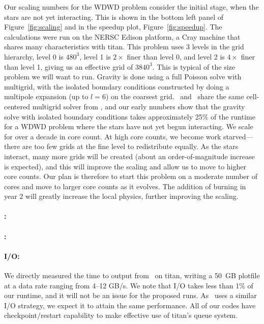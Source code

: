 Our scaling numbers for the WDWD problem consider the initial stage,
when the stars are not yet interacting.  This is shown in the bottom
left panel of Figure~\ref{fig:scaling} and in the speedup plot, Figure~\ref{fig:speedup}.
The calculations were run on the NERSC Edison
platform, a Cray machine that shares many characteristics with titan.
This problem uses 3 levels in the grid hierarchy, level 0 is $480^3$,
level 1 is $2\times$ finer than level 0, and level 2 is $4\times$
finer than level 1, giving us an effective grid of $3840^3$.  This is
typical of the size problem we will want to run.  Gravity is done
using a full Poisson solve with multigrid, with the isolated boundary
conditions constructed by doing a multipole expansion (up to $l=6$) on
the coarsest grid.  \castro\ and \maestro\ share the same
cell-centered multigrid solver from \boxlib, and our early numbers
show that the gravity solve with isolated boundary conditions takes
approximately 25\% of the runtime for a WDWD problem where the stars
have not yet begun interacting.  We scale for over a decade in core count.  At high core counts, we become work
starved---there are too few grids at the fine level to redistribute equally.  As the stars interact, many more grids will be created
(about an order-of-magnitude increase is expected), and this will
improve the scaling and allow us to move to higher core counts.  Our
plan is therefore to start this problem on a moderate number of cores
and move to larger core counts as it evolves.  The addition of burning
in year 2 will greatly increase the local physics, further improving
the scaling.

\paragraph{\flash: } 

\paragraph{\chimera: } 

\paragraph{I/O: } 
%
We directly measured the time to output from
\maestro\ on titan, writing a 50~GB plotfile at a data rate
ranging from 4--12 GB/s.  We note that I/O takes less than 1\% of our
runtime, and it will not be an issue for the proposed runs.
As \castro\ uses a similar I/O strategy, we expect it to attain the
same performance.  All of our codes have checkpoint/restart capability 
to make effective use of titan's queue system.


